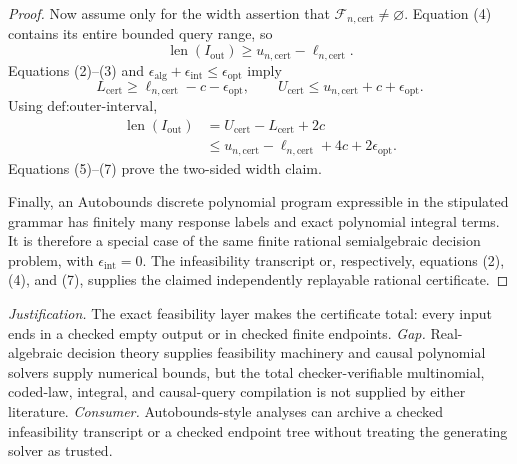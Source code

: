 \documentclass{article}
\begin{document}
\begin{proof}
Now assume only for the width assertion that \(\mathcal F_{n,\mathrm{cert}}\ne\varnothing\).  Equation (4) contains its entire bounded query range, so
\[
\operatorname{len}(I_{\mathrm{out}})\geq
u_{n,\mathrm{cert}}-\ell_{n,\mathrm{cert}}. \tag{5}
\]
Equations (2)--(3) and \(\epsilon_{\mathrm{alg}}+\epsilon_{\mathrm{int}}\leq\epsilon_{\mathrm{opt}}\) imply
\[
L_{\mathrm{cert}}\geq\ell_{n,\mathrm{cert}}-c-\epsilon_{\mathrm{opt}},
\qquad
U_{\mathrm{cert}}\leq u_{n,\mathrm{cert}}+c+\epsilon_{\mathrm{opt}}. \tag{6}
\]
Using \(\text{def:outer-interval}\),
\[
\begin{aligned}
\operatorname{len}(I_{\mathrm{out}})
&=U_{\mathrm{cert}}-L_{\mathrm{cert}}+2c\\
&\leq u_{n,\mathrm{cert}}-\ell_{n,\mathrm{cert}}+4c+2\epsilon_{\mathrm{opt}}.
\end{aligned} \tag{7}
\]
Equations (5)--(7) prove the two-sided width claim.

Finally, an Autobounds discrete polynomial program expressible in the stipulated grammar has finitely many response labels and exact polynomial integral terms.  It is therefore a special case of the same finite rational semialgebraic decision problem, with \(\epsilon_{\mathrm{int}}=0\).  The infeasibility transcript or, respectively, equations (2), (4), and (7), supplies the claimed independently replayable rational certificate.
\end{proof}
\par\smallskip\noindent \textit{Justification.} The exact feasibility layer makes the certificate total: every input ends in a checked empty output or in checked finite endpoints. \textit{Gap.} Real-algebraic decision theory supplies feasibility machinery and causal polynomial solvers supply numerical bounds, but the total checker-verifiable multinomial, coded-law, integral, and causal-query compilation is not supplied by either literature. \textit{Consumer.} Autobounds-style analyses can archive a checked infeasibility transcript or a checked endpoint tree without treating the generating solver as trusted.
\end{document}
